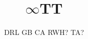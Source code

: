 \documentclass[11pt]{article}
\begin{document}
\title{$\infty$TT}
\author{DRL \qquad GB \qquad CA \qquad RWH? \qquad TA?}
\maketitle


\end{document}
